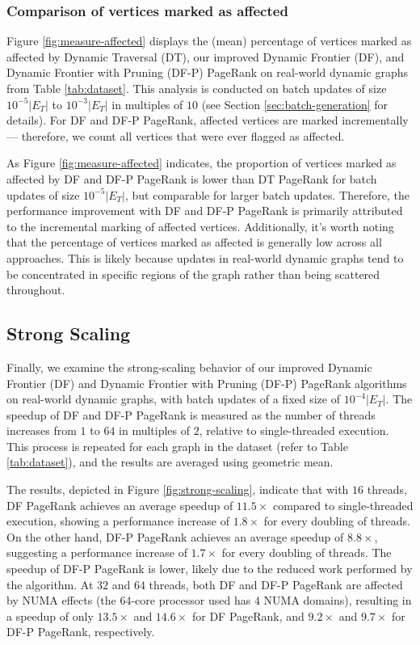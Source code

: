\subsubsection{Comparison of vertices marked as affected}

Figure \ref{fig:measure-affected} displays the (mean) percentage of vertices marked as affected by Dynamic Traversal (DT), our improved Dynamic Frontier (DF), and Dynamic Frontier with Pruning (DF-P) PageRank on real-world dynamic graphs from Table \ref{tab:dataset}. This analysis is conducted on batch updates of size $10^{-5}|E_T|$ to $10^{-3}|E_T|$ in multiples of $10$ (see Section \ref{sec:batch-generation} for details). For DF and DF-P PageRank, affected vertices are marked incrementally --- therefore, we count all vertices that were ever flagged as affected.

As Figure \ref{fig:measure-affected} indicates, the proportion of vertices marked as affected by DF and DF-P PageRank is lower than DT PageRank for batch updates of size $10^{-5}|E_T|$, but comparable for larger batch updates. Therefore, the performance improvement with DF and DF-P PageRank is primarily attributed to the incremental marking of affected vertices. Additionally, it's worth noting that the percentage of vertices marked as affected is generally low across all approaches. This is likely because updates in real-world dynamic graphs tend to be concentrated in specific regions of the graph rather than being scattered throughout.








\subsection{Strong Scaling}

Finally, we examine the strong-scaling behavior of our improved Dynamic Frontier (DF) and Dynamic Frontier with Pruning (DF-P) PageRank algorithms on real-world dynamic graphs, with batch updates of a fixed size of $10^{-4}|E_T|$. The speedup of DF and DF-P PageRank is measured as the number of threads increases from $1$ to $64$ in multiples of $2$, relative to single-threaded execution. This process is repeated for each graph in the dataset (refer to Table \ref{tab:dataset}), and the results are averaged using geometric mean.

The results, depicted in Figure \ref{fig:strong-scaling}, indicate that with $16$ threads, DF PageRank achieves an average speedup of $11.5\times$ compared to single-threaded execution, showing a performance increase of $1.8\times$ for every doubling of threads. On the other hand, DF-P PageRank achieves an average speedup of $8.8\times$, suggesting a performance increase of $1.7\times$ for every doubling of threads. The speedup of DF-P PageRank is lower, likely due to the reduced work performed by the algorithm. At $32$ and $64$ threads, both DF and DF-P PageRank are affected by NUMA effects (the $64$-core processor used has $4$ NUMA domains), resulting in a speedup of only $13.5\times$ and $14.6\times$ for DF PageRank, and $9.2\times$ and $9.7\times$ for DF-P PageRank, respectively.
